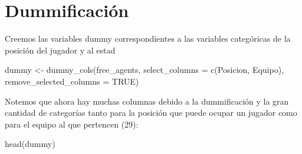 \documentclass[
]{article}
\newenvironment{Shaded}{\begin{snugshade}}{\end{snugshade}}
\newcommand{\AttributeTok}[1]{\textcolor[rgb]{0.77,0.63,0.00}{#1}}
\newcommand{\ConstantTok}[1]{\textcolor[rgb]{0.00,0.00,0.00}{#1}}
\newcommand{\FunctionTok}[1]{\textcolor[rgb]{0.00,0.00,0.00}{#1}}
\newcommand{\NormalTok}[1]{#1}
\newcommand{\OtherTok}[1]{\textcolor[rgb]{0.56,0.35,0.01}{#1}}
\newcommand{\StringTok}[1]{\textcolor[rgb]{0.31,0.60,0.02}{#1}}
\begin{document}
\section{Dummificación}

Creemos las variables dummy correspondientes a las variables categóricas
de la posición del jugador y al estad

\begin{Shaded}
\begin{Highlighting}[]
\NormalTok{dummy }\OtherTok{\textless{}{-}} \FunctionTok{dummy\_cols}\NormalTok{(free\_agents, }\AttributeTok{select\_columns =} \FunctionTok{c}\NormalTok{(}\StringTok{\textquotesingle{}Posicion\textquotesingle{}}\NormalTok{, }\StringTok{\textquotesingle{}Equipo\textquotesingle{}}\NormalTok{),}
                    \AttributeTok{remove\_selected\_columns =} \ConstantTok{TRUE}\NormalTok{)}
\end{Highlighting}
\end{Shaded}

Notemos que ahora hay muchas columnas debido a la dummificación y la
gran cantidad de categorías tanto para la posición que puede ocupar un
jugador como para el equipo al que pertencen (29):

\begin{Shaded}
\begin{Highlighting}[]
\FunctionTok{head}\NormalTok{(dummy)}
\end{Highlighting}
\end{Shaded}
\end{document}
